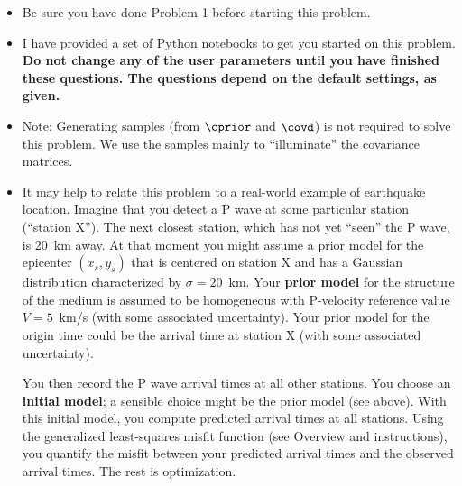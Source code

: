 \documentclass[11pt,titlepage,fleqn]{article}
\begin{document}
\begin{itemize}
\item Be sure you have done Problem 1 before starting this problem.

\item I have provided a set of Python notebooks to get you started on this problem. {\bf Do not change any of the user parameters until you have finished these questions. The questions depend on the default settings, as given.}

\item Note: Generating samples (from $\cprior$ and $\covd$) is not required to solve this problem. We use the samples mainly to ``illuminate'' the covariance matrices.

\item It may help to relate this problem to a real-world example of earthquake location. Imagine that you detect a P wave at some particular station (``station X''). The next closest station, which has not yet ``seen'' the P wave, is 20~km away. At that moment you might assume a prior model for the epicenter $(x_s, y_s)$ that is centered on station X and has a Gaussian distribution characterized by $\sigma = 20$~km. 
Your {\bf prior model} for the structure of the medium is assumed to be homogeneous with P-velocity reference value $V = 5$~km/s (with some associated uncertainty). Your prior model for the origin time could be the arrival time at station X (with some associated uncertainty).

You then record the P wave arrival times at all other stations. You choose an {\bf initial model}; a sensible choice might be the prior model (see above). With this initial model, you compute predicted arrival times at all stations. Using the generalized least-squares misfit function (see Overview and instructions), you quantify the misfit between your predicted arrival times and the observed arrival times. The rest is optimization.

\end{itemize}

\end{document}

